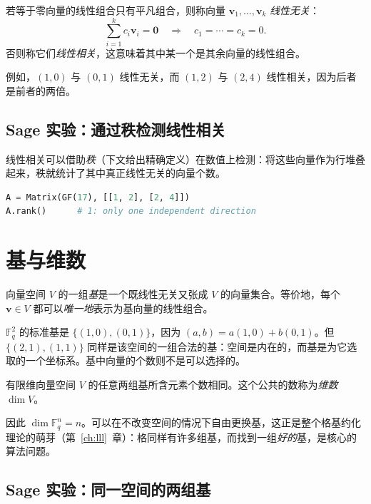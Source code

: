 \begin{definition}[线性无关]
若等于零向量的线性组合只有平凡组合，则称向量 $\mathbf{v}_1,\dots,\mathbf{v}_k$ \emph{线性无关}：
\[
\sum_{i=1}^k c_i \mathbf{v}_i = \mathbf{0} \quad\Longrightarrow\quad c_1 = \cdots = c_k = 0.
\]
否则称它们\emph{线性相关}，这意味着其中某一个是其余向量的线性组合。
\end{definition}

例如，$(1,0)$ 与 $(0,1)$ 线性无关，而 $(1,2)$ 与 $(2,4)$ 线性相关，因为后者是前者的两倍。

\subsection{Sage 实验：通过秩检测线性相关}
线性相关可以借助\emph{秩}（下文给出精确定义）在数值上检测：将这些向量作为行堆叠起来，秩就统计了其中真正线性无关的向量个数。

\begin{lstlisting}[language=Python]
A = Matrix(GF(17), [[1, 2], [2, 4]])
A.rank()      # 1: only one independent direction
\end{lstlisting}

\section{基与维数}
\begin{definition}[基]
向量空间 $V$ 的一组\emph{基}是一个既线性无关又张成 $V$ 的向量集合。等价地，每个 $\mathbf{v}\in V$ 都可以\emph{唯一地}表示为基向量的线性组合。
\end{definition}

$\mathbb{F}_q^2$ 的标准基是 $\{(1,0),(0,1)\}$，因为 $(a,b)=a(1,0)+b(0,1)$。但 $\{(2,1),(1,1)\}$ 同样是该空间的一组合法的基：空间是内在的，而基是为它选取的一个坐标系。基中向量的个数则不是可以选择的。

\begin{theorem}[维数是良定义的]
有限维向量空间 $V$ 的任意两组基所含元素个数相同。这个公共的数称为\emph{维数} $\dim V$。
\end{theorem}

因此 $\dim \mathbb{F}_q^n = n$。可以在不改变空间的情况下自由更换基，这正是整个格基约化理论的萌芽（第~\ref{ch:lll}~章）：格同样有许多组基，而找到一组\emph{好的}基，是核心的算法问题。

\subsection{Sage 实验：同一空间的两组基}

